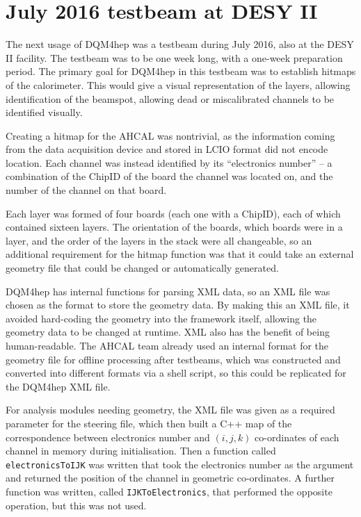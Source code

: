 \section{July 2016 testbeam at DESY II}
The next usage of \acrshort{DQM4hep} was a testbeam during July 2016, also at the DESY II facility. The testbeam was to be one week long, with a one-week preparation period. The primary goal for \acrshort{DQM4hep} in this testbeam was to establish hitmaps of the calorimeter. This would give a visual representation of the layers, allowing identification of the beamspot, allowing dead or miscalibrated channels to be identified visually.

Creating a hitmap for the \acrshort{AHCAL} was nontrivial, as the information coming from the data acquisition device and stored in LCIO format did not encode location. Each channel was instead identified by its ``electronics number'' -- a combination of the ChipID of the board the channel was located on, and the number of the channel on that board.

Each layer was formed of four boards (each one with a ChipID), each of which contained sixteen layers. The orientation of the boards, which boards were in a layer, and the order of the layers in the stack were all changeable, so an additional requirement for the hitmap function was that it could take an external geometry file that could be changed or automatically generated. 

\acrshort{DQM4hep} has internal functions for parsing \acrshort{XML} data, so an \acrshort{XML} file was chosen as the format to store the geometry data. By making this an \acrshort{XML} file, it avoided hard-coding the geometry into the framework itself, allowing the geometry data to be changed at runtime. \acrshort{XML} also has the benefit of being human-readable. The AHCAL team already used an internal format for the geometry file for offline processing after testbeams, which was constructed and converted into different formats via a  shell script, so this could be replicated for the \acrshort{DQM4hep} \acrshort{XML} file.

For analysis modules needing geometry, the \acrshort{XML} file was given as a required parameter for the steering file, which then built a C++ map of the correspondence between electronics number and $(i,j,k)$ co-ordinates of each channel in memory during initialisation. Then a function called \texttt{electronicsToIJK} was written that took the electronics number as the argument and returned the position of the channel in geometric co-ordinates. A further function was written, called \texttt{IJKToElectronics}, that performed the opposite operation, but this was not used. 

